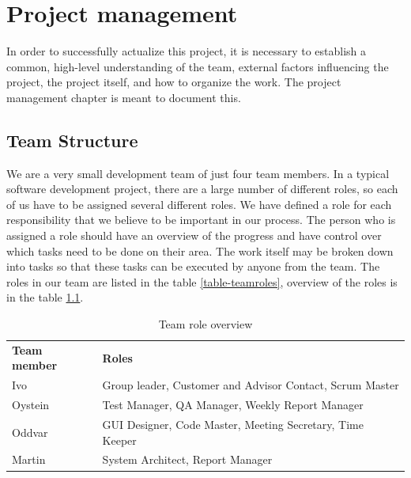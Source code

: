 \chapter{Project management}

In order to successfully actualize this project, it is necessary to establish a common, high-level understanding of the team, external factors influencing the project, the project itself, and how to organize the work. The project management chapter is meant to document this.

\section{Team Structure}
We are a very small development team of just four team members. In a typical software development project, there are a large number of different roles, so each of us have to be assigned several different roles. We have defined a role for each responsibility that we believe to be important in our process. The person who is assigned a role should have an overview of the progress and have control over which tasks need to be done on their area. The work itself may be broken down into tasks so that these tasks can be executed by anyone from the team. The roles in our team are listed in the table \ref{table-teamroles}, overview of the roles is in the table \ref{table-rolesoverview}.

\begin{table}
\centering
\begin{tabular}{ l  l }
  \hline
  \textbf{Team member} & \textbf{Roles} \\
  Ivo & Group leader, Customer and Advisor Contact, Scrum Master \\
  Oystein & Test Manager, QA Manager, Weekly Report Manager \\
  Oddvar & GUI Designer, Code Master, Meeting Secretary, Time Keeper \\
  Martin & System Architect, Report Manager \\
  \hline
\end{tabular}
\label{table-rolesoverview}
\caption{Team role overview}
\end{table}


